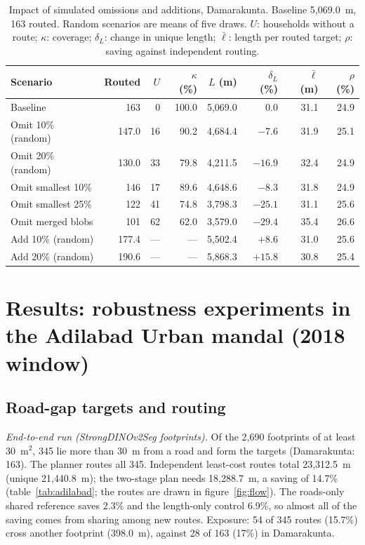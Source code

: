 \documentclass[12pt,a4paper]{article}
\newcommand{\dinoseg}{StrongDINOv2Seg}
\begin{document}
\begin{table}[t]
\caption{Impact of simulated omissions and additions, Damarakunta. Baseline 5{,}069.0~m, 163 routed. Random scenarios are means of five draws. $U$: households without a route; $\kappa$: coverage; $\delta_L$: change in unique length; $\bar\ell$: length per routed target; $\rho$: saving against independent routing.}
\label{tab:omission}
\centering
\small
\begin{tabular}{@{}lrrrrrrr@{}}
\toprule
Scenario & Routed & $U$ & $\kappa$ (\%) & $L$ (m) & $\delta_L$ (\%) & $\bar\ell$ (m) & $\rho$ (\%)\\
\midrule
Baseline & 163 & 0 & 100.0 & 5{,}069.0 & 0.0 & 31.1 & 24.9\\
Omit 10\% (random) & 147.0 & 16 & 90.2 & 4{,}684.4 & $-7.6$ & 31.9 & 25.1\\
Omit 20\% (random) & 130.0 & 33 & 79.8 & 4{,}211.5 & $-16.9$ & 32.4 & 24.9\\
Omit smallest 10\% & 146 & 17 & 89.6 & 4{,}648.6 & $-8.3$ & 31.8 & 24.9\\
Omit smallest 25\% & 122 & 41 & 74.8 & 3{,}798.3 & $-25.1$ & 31.1 & 25.6\\
Omit merged blobs & 101 & 62 & 62.0 & 3{,}579.0 & $-29.4$ & 35.4 & 26.6\\
\midrule
Add 10\% (random) & 177.4 & --- & --- & 5{,}502.4 & $+8.6$ & 31.0 & 25.6\\
Add 20\% (random) & 190.6 & --- & --- & 5{,}868.3 & $+15.8$ & 30.8 & 25.4\\
\bottomrule
\end{tabular}
\end{table}

\section{Results: robustness experiments in the Adilabad Urban mandal (2018 window)}\label{sec:adilabad}
\subsection{Road-gap targets and routing}
\emph{End-to-end run (\dinoseg{} footprints).} Of the 2{,}690 footprints of at least 30~m$^2$, 345 lie more than 30~m from a road and form the targets (Damarakunta: 163). The planner routes all 345. Independent least-cost routes total 23{,}312.5~m (unique 21{,}440.8~m); the two-stage plan needs 18{,}288.7~m, a saving of 14.7\% (table~\ref{tab:adilabad}; the routes are drawn in figure~\ref{fig:flow}). The roads-only shared reference saves 2.3\% and the length-only control 6.9\%, so almost all of the saving comes from sharing among new routes. Exposure: 54 of 345 routes (15.7\%) cross another footprint (398.0~m), against 28 of 163 (17\%) in Damarakunta.
\end{document}
